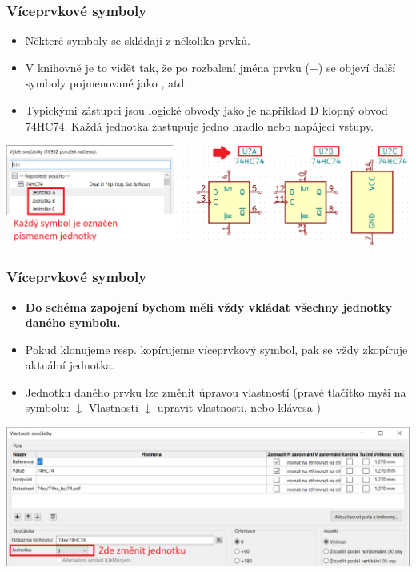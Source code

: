 \documentclass{beamer}
\begin{document}
\begin{frame}
	\frametitle{Víceprvkové symboly}
	\small
	\begin{itemize}
		\item Některé symboly se skládají z několika prvků.
		\item V knihovně je to vidět tak, že po rozbalení jména prvku (+) se objeví další symboly pojmenované jako ,  atd.
		\item Typickými zástupci jsou logické obvody jako je například D klopný obvod 74HC74. Každá jednotka zastupuje jedno hradlo nebo napájecí vstupy.
	\end{itemize}
	
	\begin{center}
		\includegraphics[width=\textwidth]{obr/umisti_soucastku03.png}
	\end{center}
	
\end{frame}
\begin{frame}
	\frametitle{Víceprvkové symboly}
	\small
	\begin{itemize}
		\item \textbf{Do schéma zapojení bychom měli vždy vkládat všechny jednotky daného symbolu.}
		\item Pokud klonujeme resp. kopírujeme víceprvkový symbol, pak se vždy zkopíruje aktuální jednotka.
		\item Jednotku daného prvku lze změnit úpravou vlastností (pravé tlačítko myši na symbolu: $\downarrow$ Vlastnosti $\downarrow$ upravit vlastnosti, nebo klávesa )
	\end{itemize}
	
	\begin{center}
		\includegraphics[width=\textwidth]{obr/umisti_soucastku04.png}
	\end{center}
	
\end{frame}
\end{document}
